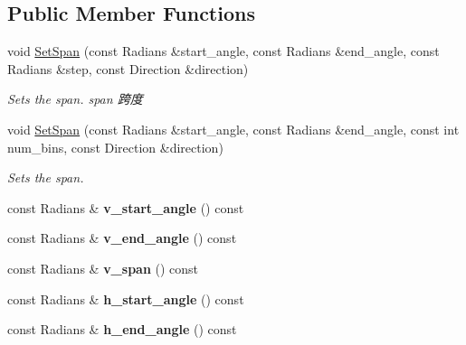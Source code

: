 \subsection*{Public Member Functions}
\begin{DoxyCompactItemize}
\item 
void \hyperlink{classdepth__clustering_1_1ProjectionParams_a4870b3432dbb7102a4b9c3668f3a353f}{Set\-Span} (const Radians \&start\-\_\-angle, const Radians \&end\-\_\-angle, const Radians \&step, const Direction \&direction)
\begin{DoxyCompactList}\small\item\em Sets the span. span 跨度 \end{DoxyCompactList}\item 
void \hyperlink{classdepth__clustering_1_1ProjectionParams_a8ccde968921c0a9336f5f024a2b989fd}{Set\-Span} (const Radians \&start\-\_\-angle, const Radians \&end\-\_\-angle, const int num\-\_\-bins, const Direction \&direction)
\begin{DoxyCompactList}\small\item\em Sets the span. \end{DoxyCompactList}\item 
\hypertarget{classdepth__clustering_1_1ProjectionParams_ab6a3d4820fca36bb4883f7cab061e0f6}{const Radians \& {\bfseries v\-\_\-start\-\_\-angle} () const }\label{classdepth__clustering_1_1ProjectionParams_ab6a3d4820fca36bb4883f7cab061e0f6}

\item 
\hypertarget{classdepth__clustering_1_1ProjectionParams_a47d4acd5c4616bb1e2b210a6d869de96}{const Radians \& {\bfseries v\-\_\-end\-\_\-angle} () const }\label{classdepth__clustering_1_1ProjectionParams_a47d4acd5c4616bb1e2b210a6d869de96}

\item 
\hypertarget{classdepth__clustering_1_1ProjectionParams_a355e40e80923bccb7d7314535cf2d3f4}{const Radians \& {\bfseries v\-\_\-span} () const }\label{classdepth__clustering_1_1ProjectionParams_a355e40e80923bccb7d7314535cf2d3f4}

\item 
\hypertarget{classdepth__clustering_1_1ProjectionParams_a8ec2462f874715605a60c5c3fe8f239f}{const Radians \& {\bfseries h\-\_\-start\-\_\-angle} () const }\label{classdepth__clustering_1_1ProjectionParams_a8ec2462f874715605a60c5c3fe8f239f}

\item 
\hypertarget{classdepth__clustering_1_1ProjectionParams_a8e7cc2ebd600942e0873ea19e102676e}{const Radians \& {\bfseries h\-\_\-end\-\_\-angle} () const }\label{classdepth__clustering_1_1ProjectionParams_a8e7cc2ebd600942e0873ea19e102676e}


\end{DoxyCompactItemize}
